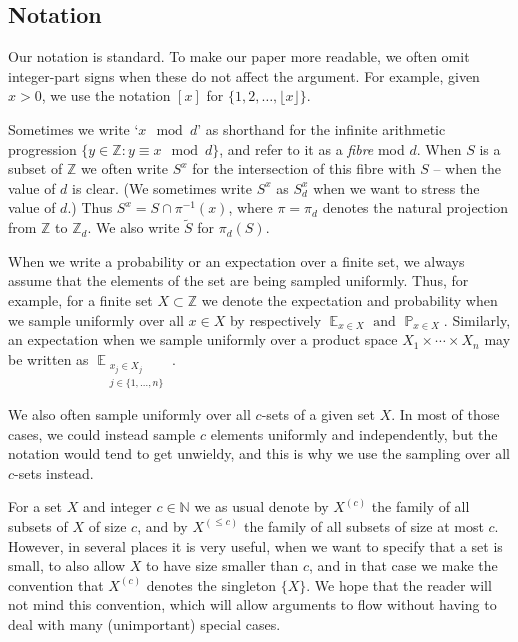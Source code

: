 \documentclass[12pt,reqno]{amsart}
\DeclareMathOperator*{\E}{\mathbb{E}}
\DeclareMathOperator*{\Prob}{\mathbb{P}}
\theoremstyle{definition}
\renewcommand\le{\leqslant}
\begin{document}
\vspace{10pt}
\subsection{Notation}
Our notation is standard. To make our paper more readable, we often omit integer-part signs when these do not affect the
argument. For example, given
$x>0$, we use the notation $[x]$ for $\{1,2, \hdots, \lfloor x \rfloor\}$.

\vspace{5pt}
Sometimes we write `$x \mod d$' as shorthand for the infinite arithmetic progression
$\{ y \in \mathbb{Z}: y \equiv x \mod d \}$, and refer to it as a {\em fibre} mod $d$.
When $S$ is a subset of $\mathbb{Z}$ we often write $S^x$ for the intersection of this fibre with
$S$ -- when the value of $d$ is clear. (We sometimes write $S^x$ as $S^x_d$ when we want to stress the value of $d$.)
Thus $S^x=S\cap \pi^{-1}(x)$, where $\pi = \pi_d$ denotes
the natural projection from $\mathbb{Z}$ to $\mathbb{Z}_d$. We also write $\widetilde{S}$
for $\pi_d(S)$.

\vspace{5pt}
When we write a probability or an expectation over a finite set, we always assume that the elements
of the set are being sampled uniformly. Thus, for example,
for a finite set $X\subset \mathbb{Z}$ we denote the expectation and probability when we sample uniformly over
all $x \in X$ by respectively $\E_{x\in X} \text{ and } \Prob_{x\in X}.$ Similarly, an expectation when
we sample uniformly over a product space $X_1 \times \cdots \times X_n$ may be written as
$\E_{\substack{x_j \in X_j \\ j \in \{1,\hdots,n \}}}$.


We also often sample uniformly over all $c$-sets of a given set $X$. In most of those cases,
we could instead sample $c$ elements uniformly and independently, but the notation would tend to get
unwieldy, and this is why we use the sampling over all $c$-sets instead.

\vspace{5pt}
For a set $X$ and integer $c \in \mathbb{N}$ we as usual denote by $X^{(c)}$ the family of
all subsets of $X$ of size $c$, and by $X^{(\le c)}$ the family of
all subsets of size at most $c$. However, in several places it is very useful, when we want to
specify that a set is small, to also allow $X$ to have size smaller than $c$, and in that case
we make the convention that $X^{(c)}$ denotes the singleton $\{ X \}$. We hope that the reader will
not mind this convention, which will allow arguments to flow without having to deal
with many (unimportant) special cases.
\end{document}
